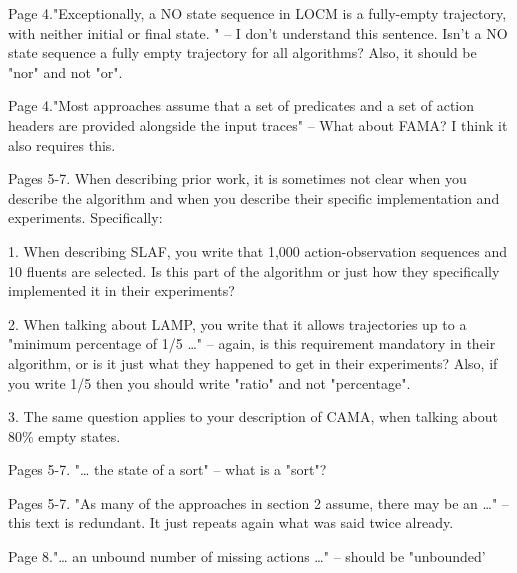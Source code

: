 \documentclass{article}
\begin{document}
\begin{mdframed}[hidealllines=true,backgroundcolor=gray!20]
  Page 4."Exceptionally, a NO state sequence in LOCM is a fully-empty trajectory, with neither initial or final state. " – I don't understand this sentence. Isn't a NO state sequence a fully empty trajectory for all algorithms? Also, it should be "nor" and not "or".
\end{mdframed}


\begin{mdframed}[hidealllines=true,backgroundcolor=gray!20]
   Page 4."Most approaches assume that a set of predicates and a set of action headers are provided alongside the input traces" – What about FAMA? I think it also requires this.
\end{mdframed}


\begin{mdframed}[hidealllines=true,backgroundcolor=gray!20]
  Pages 5-7. When describing prior work, it is sometimes not clear when you describe the algorithm and when you describe their specific implementation and experiments. Specifically:

1.       When describing SLAF, you write that 1,000 action-observation sequences and 10 fluents are selected. Is this part of the algorithm or just how they specifically implemented it in their experiments?

2.       When talking about LAMP, you write that it allows trajectories up to a "minimum percentage of 1/5 …" – again, is this requirement mandatory in their algorithm, or is it just what they happened to get in their experiments? Also, if you write 1/5 then you should write "ratio" and not "percentage".

3.       The same question applies to your description of CAMA, when talking about 80\% empty states.
\end{mdframed}

\begin{mdframed}[hidealllines=true,backgroundcolor=gray!20]
    Pages 5-7. "… the state of a sort" – what is a "sort"?
\end{mdframed}

\begin{mdframed}[hidealllines=true,backgroundcolor=gray!20]
    Pages 5-7. "As many of the approaches in section 2 assume, there may be an …" – this text is redundant. It just repeats again what was said twice already.
\end{mdframed}

\begin{mdframed}[hidealllines=true,backgroundcolor=gray!20]
  Page 8."… an unbound number of missing actions …" – should be "unbounded'
\end{mdframed}
\end{document}
